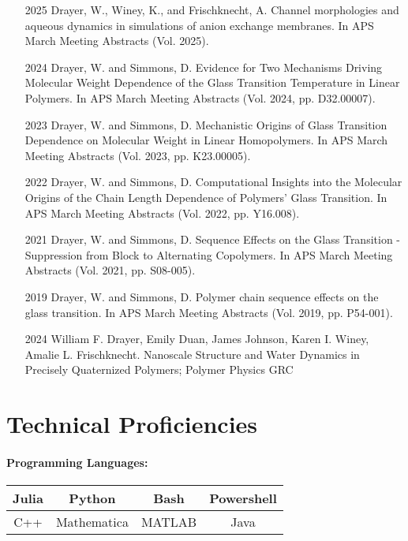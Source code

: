 \documentclass{my_cv}
\begin{document}
\begin{itemize}
    \item[2025] Drayer, W., Winey, K., and Frischknecht, A. Channel morphologies and aqueous dynamics in simulations of anion exchange membranes. In APS March Meeting Abstracts (Vol. 2025).
    \item[2024] Drayer, W. and Simmons, D. Evidence for Two Mechanisms Driving Molecular Weight Dependence of the Glass Transition Temperature in Linear Polymers. In APS March Meeting Abstracts (Vol. 2024, pp. D32.00007).
    \item[2023] Drayer, W. and Simmons, D. Mechanistic Origins of Glass Transition Dependence on Molecular Weight in Linear Homo\-polymers. In APS March Meeting Abstracts (Vol. 2023, pp. K23.00005). 
    \item[2022] Drayer, W. and Simmons, D. Computational Insights into the Molecular Origins of the Chain Length Dependence of Polymers' Glass Transition. In APS March Meeting Abstracts (Vol. 2022, pp. Y16.008).
    \item[2021] Drayer, W. and Simmons, D. Sequence Effects on the Glass Transition - Suppression from Block to Alternating Co\-polymers. In APS March Meeting Abstracts (Vol. 2021, pp. S08-005).
    \item[2019] Drayer, W. and Simmons, D. Polymer chain sequence effects on the glass transition. In APS March Meeting Abstracts (Vol. 2019, pp. P54-001).
\end{itemize}

\begin{itemize}
    \item[2024] William F. Drayer, Emily Duan, James Johnson, Karen I. Winey, Amalie L. Frischknecht. Nanoscale Structure and Water Dynamics in Precisely Quaternized Polymers; Polymer Physics GRC
\end{itemize}

\section{Technical Proficiencies}

\paragraph{Programming Languages:}
\begin{center}
\begin{tabular}{c|c|c|c}
    Julia & Python & Bash & Powershell \\
    \hline
    C++ & Mathematica & MATLAB & Java \\
\end{tabular}
\end{center}
\end{document}
